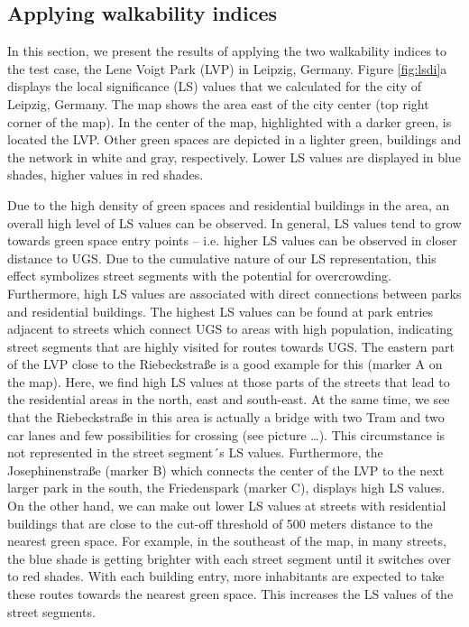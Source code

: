 \documentclass[10pt]{article}
\begin{document}
\subsection{Applying walkability indices}
In this section, we present the results of applying the two walkability indices to the test case, the Lene Voigt Park (LVP) in Leipzig, Germany.
Figure \ref{fig:lsdi}a displays the local significance (LS) values that we calculated for the city of Leipzig, Germany.
The map shows the area east of the city center (top right corner of the map). 
In the center of the map, highlighted with a darker green, is located the LVP. 
Other green spaces are depicted in a lighter green, buildings and the network in white and gray, respectively.
Lower LS values are displayed in blue shades, higher values in red shades.

Due to the high density of green spaces and residential buildings in the area, an overall high level of LS values can be observed.
In general, LS values tend to grow towards green space entry points – i.e. higher LS values can be observed in closer distance to UGS.
Due to the cumulative nature of our LS representation, this effect symbolizes street segments with the potential for overcrowding.
Furthermore, high LS values are associated with direct connections between parks and residential buildings.
The highest LS values can be found at park entries adjacent to streets which connect UGS to areas with high population, indicating street segments that are highly visited for routes towards UGS. 
The eastern part of the LVP close to the Riebeckstraße is a good example for this (marker A on the map). 
Here, we find high LS values at those parts of the streets that lead to the residential areas in the north, east and south-east.
At the same time, we see that the Riebeckstraße in this area is actually a bridge with two Tram and two car lanes and few possibilities for crossing (see picture …). 
This circumstance is not represented in the street segment´s LS values.
Furthermore, the Josephinenstraße (marker B) which connects the center of the LVP to the next larger park in the south, the Friedenspark (marker C), displays high LS values.
On the other hand, we can make out lower LS values at streets with residential buildings that are close to the cut-off threshold of 500 meters distance to the nearest green space.
For example, in the southeast of the map, in many streets, the blue shade is getting brighter with each street segment until it switches over to red shades.
With each building entry, more inhabitants are expected to take these routes towards the nearest green space.
This increases the LS values of the street segments.
\end{document}
